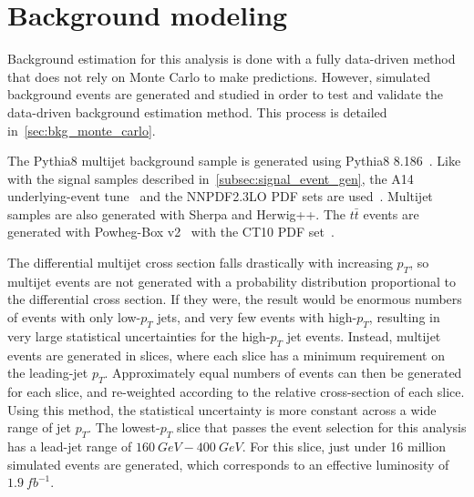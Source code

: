 \section{Background modeling}\label{sec:bkg_modeling}

Background estimation for this analysis is done with a fully data-driven method that does not rely on Monte Carlo to make predictions.
However, simulated background events are generated and studied in order to test and validate the data-driven background estimation method.
This process is detailed in~\ref{sec:bkg_monte_carlo}.

The Pythia8 multijet background sample is generated using Pythia8 8.186~\cite{signal-pythia}.
Like with the signal samples described in~\ref{subsec:signal_event_gen}, the A14 underlying-event tune~\cite{signal-pythia,signal-pythia-a14} and the NNPDF2.3LO PDF sets are used~\cite{signal-nnpdf}.
Multijet samples are also generated with Sherpa and Herwig++.
The $t\bar{t}$ events are generated with Powheg-Box v2~\cite{mc-powheg} with the CT10 PDF set~\cite{mc-ct10-pdf}.

The differential multijet cross section falls drastically with increasing $p_{T}$, so multijet events are not generated with a probability distribution proportional to the differential cross section.
If they were, the result would be enormous numbers of events with only low-$p_{T}$ jets, and very few events with high-$p_{T}$, resulting in very large statistical uncertainties for the high-$p_{T}$ jet events.
Instead, multijet events are generated in slices, where each slice has a minimum requirement on the leading-jet $p_{T}$.
Approximately equal numbers of events can then be generated for each slice, and re-weighted according to the relative cross-section of each slice.
Using this method, the statistical uncertainty is more constant across a wide range of jet $p_{T}$.
The lowest-$p_{T}$ slice that passes the event selection for this analysis has a lead-jet range of $160~GeV - 400~GeV$.
For this slice, just under 16 million simulated events are generated, which corresponds to an effective luminosity of $1.9~fb^{-1}$.